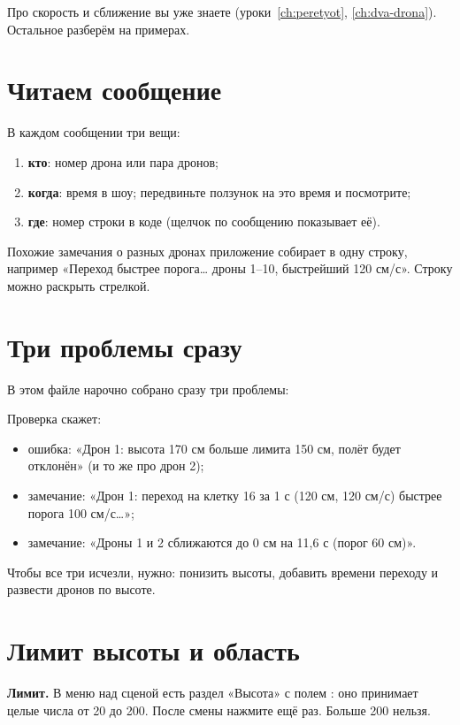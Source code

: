 Про скорость и сближение вы уже знаете (уроки~\ref{ch:peretyot}, \ref{ch:dva-drona}). Остальное разберём на примерах.

\section{Читаем сообщение}

В каждом сообщении три вещи:
\begin{enumerate}
  \item \textbf{кто}: номер дрона или пара дронов;
  \item \textbf{когда}: время в шоу; передвиньте ползунок на это время и посмотрите;
  \item \textbf{где}: номер строки в коде (щелчок по сообщению показывает её).
\end{enumerate}
Похожие замечания о разных дронах приложение собирает в одну строку, например «Переход быстрее порога… дроны 1--10, быстрейший 120 см/с». Строку можно раскрыть стрелкой.

\section{Три проблемы сразу}

В этом файле нарочно собрано сразу три проблемы:


Проверка скажет:
\begin{itemize}
  \item ошибка: «Дрон 1: высота 170 см больше лимита 150 см, полёт будет отклонён» (и то же про дрон 2);
  \item замечание: «Дрон 1: переход на клетку 16 за 1 с (120 см, 120 см/с) быстрее порога 100 см/с…»;
  \item замечание: «Дроны 1 и 2 сближаются до 0 см на 11,6 с (порог 60 см)».
\end{itemize}
Чтобы все три исчезли, нужно: понизить высоты, добавить времени переходу и развести дронов по высоте.

\section{Лимит высоты и область}

\textbf{Лимит.} В меню  над сценой есть раздел «Высота» с полем : оно принимает целые числа от 20 до 200. После смены нажмите  ещё раз. Больше 200 нельзя.

